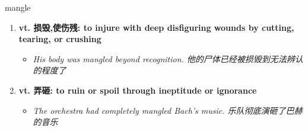 
\begin{frame}
{\huge mangle}
\begin{center}
\begin{enumerate}\Large
  \item \textbf{vt. 损毁,使伤残: to injure with deep disfiguring wounds by cutting, tearing, or crushing}
  \begin{itemize}
    \item \em{\Large{His body was mangled beyond recognition. 他的尸体已经被损毁到无法辨认的程度了}}
  \end{itemize}
  \item \textbf{vt. 弄砸: to ruin or spoil through ineptitude or ignorance}
  \begin{itemize}
    \item \em{\Large{The orchestra had completely mangled Bach’s music. 乐队彻底演砸了巴赫的音乐}}
  \end{itemize}
\end{enumerate}
\end{center}
\end{frame}
